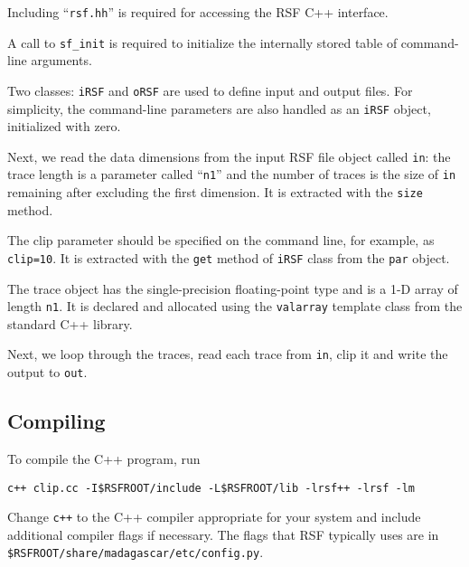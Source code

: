 
Including ``\texttt{rsf.hh}'' is required for accessing the RSF C++
interface.


A call to \texttt{sf\_init} is required to initialize the internally stored
table of command-line arguments.


Two classes: \texttt{iRSF} and \texttt{oRSF} are used to define input and
output files. For simplicity, the command-line parameters are also handled 
as an \texttt{iRSF} object, initialized with zero.


Next, we read the data dimensions from the input RSF file object called
\texttt{in}: the trace length is a parameter called ``\texttt{n1}'' and the
number of traces is the size of \texttt{in} remaining after excluding the
first dimension. It is extracted with the \texttt{size} method.

 
The clip parameter should be specified on the command line, for
example, as \texttt{clip=10}. It is extracted with the \texttt{get}
method of \texttt{iRSF} class from the \texttt{par} object.


The trace object has the single-precision floating-point type and is a
1-D array of length \texttt{n1}. It is declared and allocated using
the \texttt{valarray} template class from the standard C++ library.


Next, we loop through the traces, read each trace from \texttt{in}, clip it
and write the output to \texttt{out}.

\subsection{Compiling}

To compile the C++ program, run
\begin{verbatim}
c++ clip.cc -I$RSFROOT/include -L$RSFROOT/lib -lrsf++ -lrsf -lm
\end{verbatim}
Change \texttt{c++} to the C++ compiler appropriate for your system and
include additional compiler flags if necessary. The flags that RSF typically
uses are in \\ \texttt{\$RSFROOT/share/madagascar/etc/config.py}.

